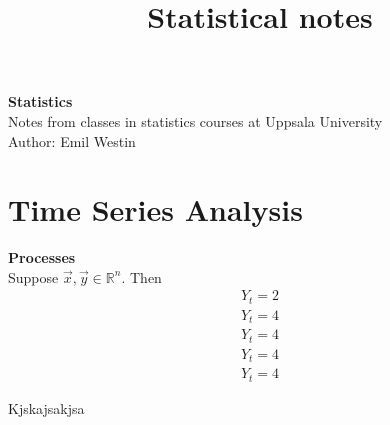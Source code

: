 \documentclass[11pt]{article}
\begin{document}
\title{Statistical notes}

\thispagestyle{empty}

\begin{center}
{\LARGE \bf Statistics}\\
Notes from classes in statistics courses at Uppsala University \\
Author: Emil Westin
\end{center}

\section{Time Series Analysis}

\textbf{Processes}\\

Suppose $\vec{x},\vec{y} \in \mathbb{R}^n$. Then 
\begin{align}
Y_t = 2 \label{MA1} \\
Y_t = 4 \label{MA2} \\
Y_t = 4 \label{AR1} \\
Y_t = 4 \label{AR2} \\
Y_t = 4 \label{ARMA} 
\end{align}

Kjskajsakjsa
\end{document}
